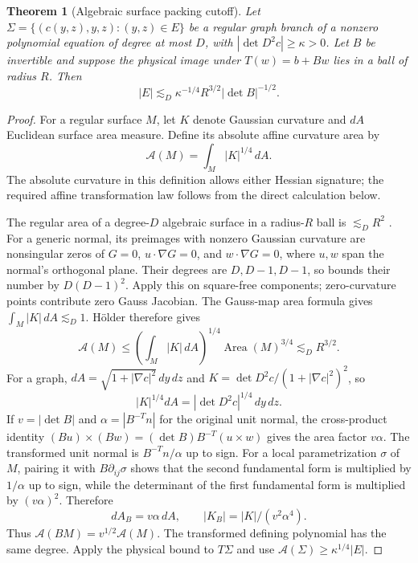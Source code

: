\documentclass[11pt]{amsart}
\newtheorem{theorem}{Theorem}[section]
\theoremstyle{definition}
\theoremstyle{remark}
\numberwithin{equation}{section}
\begin{document}
\begin{theorem}[Algebraic surface packing cutoff]\label{atlas:affine-area}
Let $\Sigma=\{(c(y,z),y,z):(y,z)\in E\}$ be a regular graph branch of a nonzero polynomial equation of degree at most $D$, with $|\det D^2c|\ge\kappa>0$. Let $B$ be invertible and suppose the physical image under $T(w)=b+Bw$ lies in a ball of radius $R$. Then
\[
|E|\lesssim_D \kappa^{-1/4}R^{3/2}|\det B|^{-1/2}.
\]
\end{theorem}
\begin{proof}
For a regular surface $M$, let $K$ denote Gaussian curvature and $dA$ Euclidean surface area measure. Define its absolute affine curvature area by
\[
\mathcal A(M)=\int_M |K|^{1/4}\,dA.
\]
The absolute curvature in this definition allows either Hessian signature; the required affine transformation law follows from the direct calculation below.

The regular area of a degree-$D$ algebraic surface in a radius-$R$ ball is $\lesssim_D R^2$ \cite[Proposition 2.5]{GuthArea}. For a generic normal, its preimages with nonzero Gaussian curvature are nonsingular zeros of $G=0$, $u\cdot\nabla G=0$, and $w\cdot\nabla G=0$, where $u,w$ span the normal's orthogonal plane. Their degrees are $D,D-1,D-1$, so \cite[Corollary 1.3]{low:roots} bounds their number by $D(D-1)^2$. Apply this on square-free components; zero-curvature points contribute zero Gauss Jacobian. The Gauss-map area formula \cite[Theorem 1]{low:area} gives $\int_M|K|\,dA\lesssim_D 1$. H\"older therefore gives
\[
\mathcal A(M)\le
\left(\int_M|K|\,dA\right)^{1/4}
\operatorname{Area}(M)^{3/4}\lesssim_D R^{3/2}.
\]
For a graph, $dA=\sqrt{1+|\nabla c|^2}\,dy\,dz$ and $K=\det D^2c/(1+|\nabla c|^2)^2$, so
\[
|K|^{1/4}dA=|\det D^2c|^{1/4}\,dy\,dz.
\]
If $v=|\det B|$ and $\alpha=|B^{-T}n|$ for the original unit normal, the cross-product identity $(Bu)\times(Bw)=(\det B)B^{-T}(u\times w)$ gives the area factor $v\alpha$. The transformed unit normal is $B^{-T}n/\alpha$ up to sign. For a local parametrization $\sigma$ of $M$, pairing it with $B\partial_{ij}\sigma$ shows that the second fundamental form is multiplied by $1/\alpha$ up to sign, while the determinant of the first fundamental form is multiplied by $(v\alpha)^2$. Therefore
\[
dA_B=v\alpha\,dA,\qquad |K_B|=|K|/(v^2\alpha^4).
\]
Thus $\mathcal A(BM)=v^{1/2}\mathcal A(M)$. The transformed defining polynomial has the same degree. Apply the physical bound to $T\Sigma$ and use $\mathcal A(\Sigma)\ge\kappa^{1/4}|E|$.
\end{proof}
\end{document}

